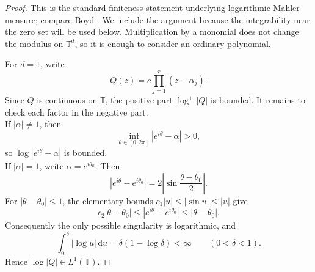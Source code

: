 \documentclass[11pt]{article}
\theoremstyle{definition}
\newcommand{\T}{\mathbb T}
\newcommand{\dd}{\,\mathrm d}
\newcommand{\1}{\mathbf 1}
\begin{document}
\begin{proof}
This is the standard finiteness statement underlying logarithmic Mahler measure; compare Boyd \cite[Section~1]{Boyd1998}.  We include the argument because the integrability near the zero set will be used below.  Multiplication by a monomial does not change the modulus on $\T^d$, so it is enough to consider an ordinary polynomial.

For $d=1$, write
\[
Q(z)=c\prod_{j=1}^r(z-\alpha_j).
\]
Since $Q$ is continuous on $\T$, the positive part $\log^+|Q|$ is bounded.  It remains to check each factor in the negative part.\\
 If $|\alpha|\neq1$, then
\[
\inf_{\theta\in[0,2\pi]}|e^{i\theta}-\alpha|>0,
\]
so $\log|e^{i\theta}-\alpha|$ is bounded.\\
If $|\alpha|=1$, write $\alpha=e^{i\theta_0}$.  Then
\begin{equation}\label{eq:circle-root-distance}
|e^{i\theta}-e^{i\theta_0}|
=2\left|\sin\frac{\theta-\theta_0}{2}\right|.
\end{equation}
For $|\theta-\theta_0|\le1$, the elementary bounds $c_1|u|\le|\sin u|\le|u|$ give
\[
c_2|\theta-\theta_0|
\le |e^{i\theta}-e^{i\theta_0}|
\le |\theta-\theta_0|.
\]
Consequently the only possible singularity is logarithmic, and
\begin{equation}\label{eq:log-integral-elementary}
\int_0^\delta |\log u|\dd u
=\delta(1-\log\delta)<\infty
\qquad(0<\delta<1).
\end{equation}
Hence $\log|Q|\in L^1(\T)$.


\end{proof}
\end{document}
